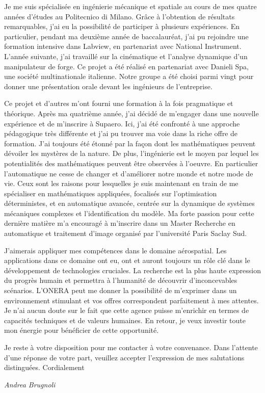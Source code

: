 \documentclass[11pt]{letter}
\begin{document}
Je me suis spécialisée en ingénierie mécanique et spatiale au cours de mes quatre années d'études au Politecnico di Milano. Grâce à l'obtention de résultats remarquables, j'ai eu la possibilité de participer à plusieurs expériences. En particulier, pendant ma deuxième année de baccalauréat, j'ai pu rejoindre une formation intensive dans Labview, en partenariat avec National Instrument. L'année suivante, j'ai travaillé sur la cinématique et l'analyse dynamique d'un manipulateur de forge. Ce projet a été réalisé en partenariat avec Danieli Spa, une société multinationale italienne. Notre groupe a été choisi parmi vingt pour donner une présentation orale devant les ingénieurs de l'entreprise. 
\begin{comment}
J'ai spécialement apprécié de travailler sur un projet de transfert interplanétaire. Dans des missions spatiales complexes différentes disciplines doivent être intégrées et c'est la raison pour la quelle j'ai travaillé passionnément au projet. Plus tard, j'ai eu l'occasion de travailler sur la dynamique multi-corps dans l'environnement Simulink pour étudier les flexibilités des appendices au cours de manoeuvres de satellites.
\end{comment}
 Ce projet et d'autres m'ont fourni une formation à la fois pragmatique et théorique. Après ma quatrième année, j'ai décidé de m'engager dans une nouvelle expérience et de m'inscrire à Supaero. Ici, j'ai été confronté à une approche pédagogique très différente et j'ai pu trouver ma voie dans la riche offre de formation. J'ai toujours été étonné par la façon dont les mathématiques peuvent dévoiler les mystères de la nature. De plus, l'ingénierie est le moyen par lequel les potentialités des mathématiques peuvent être observées à l'oeuvre. En particulier l'automatique ne cesse de changer et d'améliorer notre monde et notre mode de vie. Ceux sont les raisons pour lesquelles je suis maintenant en train de me spécialiser en mathématiques appliquées, focalisés sur l'optimisation déterministes,  et en automatique avancée, centrée sur la dynamique de systèmes mécaniques complexes et l'identification du modèle. Ma forte passion pour cette dernière matière m'a encouragé à m'inscrire dans un Master Recherche en automatique et traitement d'image organisé par l'université Paris Saclay Sud. 

J'aimerais appliquer mes compétences dans le domaine aérospatial. Les applications dans ce domaine ont eu, ont et auront toujours un rôle clé dans le développement de technologies cruciales. La recherche est la plus haute expression du progrès humain et permettra à l'humanité de découvrir d'inconcevables scénarios. L'ONERA peut me donner la possibilité de m'exprimer dans un environnement stimulant et vos offres correspondent parfaitement à mes attentes. Je n'ai aucun doute sur le fait que cette agence puisse m'enrichir en termes de capacités techniques et de valeurs humaines. En retour, je veux investir toute mon énergie pour bénéficier de cette opportunité.

Je reste à votre disposition pour me contacter à votre convenance. Dans l'attente d'une réponse de votre part, veuillez accepter l'expression de mes salutations distinguées. Cordialement


 \begin{center}
 \large\textit{Andrea Brugnoli}
 \end{center}
 
\end{document}
